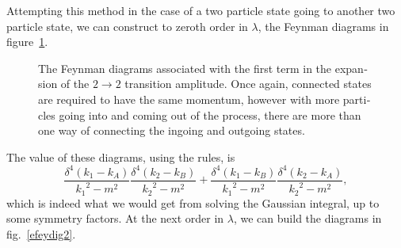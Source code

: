 \begin{english}
Attempting this method in the case of a two particle state going to another two particle state, we can construct to zeroth order in $\lambda$, the Feynman diagrams in figure~\ref{efeydig1}.
\begin{figure}[hbt]
\begin{footnotesize}\begin{center}
\end{center}\end{footnotesize}
\caption{The Feynman diagrams associated with the first term in the expansion of the $2\rightarrow2$ transition amplitude. Once again, connected states are required to have the same momentum, however with more particles going into and coming out of the process, there are more than one way of connecting the ingoing and outgoing states.
\label{efeydig1}}
\end{figure}

The value of these diagrams, using the rules, is
\[\frac{\delta^4(k_1-k_A)}{{k_1}^2-m^2}\frac{\delta^4(k_2-k_B)}{{k_2}^2-m^2}+\frac{\delta^4(k_1-k_B)}{{k_1}^2-m^2}\frac{\delta^4(k_2-k_A)}{{k_2}^2-m^2},\]
which is indeed what we would get from solving the Gaussian integral, up to some symmetry factors. At the next order in $\lambda$, we can build the diagrams in fig.~\ref{efeydig2}.

\begin{figure}[hbt]
\begin{footnotesize}\begin{center}


\end{center}
\end{footnotesize}
\end{figure}
\end{english}
